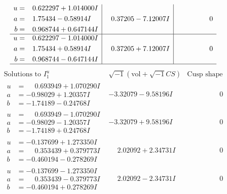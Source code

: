 \documentclass[1p]{elsarticle_modified}
\theoremstyle{definition}
\newcommand{\I}{\sqrt{-1}}
\begin{document}
$$\begin{array}{c|c|c}
\begin{aligned}
u &= \phantom{-}0.622297 + 1.014000 I \\
a &= \phantom{-}1.75434 - 0.58914 I \\
b &= \phantom{-}0.968744 + 0.647144 I\end{aligned}
 & \phantom{-}0.37205 - 7.12007 I & \phantom{-0.000000 } 0 \\ \hline\begin{aligned}
u &= \phantom{-}0.622297 - 1.014000 I \\
a &= \phantom{-}1.75434 + 0.58914 I \\
b &= \phantom{-}0.968744 - 0.647144 I\end{aligned}
 & \phantom{-}0.37205 + 7.12007 I & \phantom{-0.000000 } 0\\
 \hline 
 \end{array}$$\newpage$$\begin{array}{c|c|c}  
\text{Solutions to }I^u_{1}& \I (\text{vol} + \sqrt{-1}CS) & \text{Cusp shape}\\
 \hline 
\begin{aligned}
u &= \phantom{-}0.693949 + 1.070290 I \\
a &= -0.98029 + 1.20357 I \\
b &= -1.74189 - 0.24768 I\end{aligned}
 & -3.32079 - 9.58196 I & \phantom{-0.000000 } 0 \\ \hline\begin{aligned}
u &= \phantom{-}0.693949 - 1.070290 I \\
a &= -0.98029 - 1.20357 I \\
b &= -1.74189 + 0.24768 I\end{aligned}
 & -3.32079 + 9.58196 I & \phantom{-0.000000 } 0 \\ \hline\begin{aligned}
u &= -0.137699 + 1.273350 I \\
a &= \phantom{-}0.353439 + 0.379773 I \\
b &= -0.460194 - 0.278269 I\end{aligned}
 & \phantom{-}2.02092 + 2.34731 I & \phantom{-0.000000 } 0 \\ \hline\begin{aligned}
u &= -0.137699 - 1.273350 I \\
a &= \phantom{-}0.353439 - 0.379773 I \\
b &= -0.460194 + 0.278269 I\end{aligned}
 & \phantom{-}2.02092 - 2.34731 I & \phantom{-0.000000 } 0 \\ \hline\begin{aligned}

\end{aligned}
\end{array}$$
\end{document}
